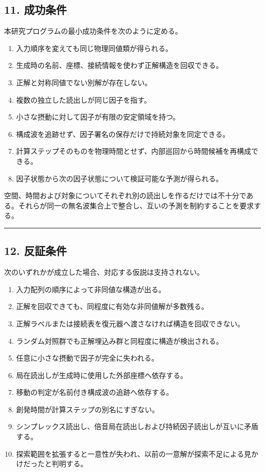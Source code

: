 \documentclass[
  a4paper,
]{ltjsarticle}
\providecommand{\tightlist}{%
  \setlength{\itemsep}{0pt}\setlength{\parskip}{0pt}}
\begin{document}
\subsection{11. 成功条件}\label{ux6210ux529fux6761ux4ef6}

本研究プログラムの最小成功条件を次のように定める。

\begin{enumerate}
\def\labelenumi{\arabic{enumi}.}
\tightlist
\item
  入力順序を変えても同じ物理同値類が得られる。
\item
  生成時の名前、座標、接続情報を使わず正解構造を回収できる。
\item
  正解と対称同値でない別解が存在しない。
\item
  複数の独立した読出しが同じ因子を指す。
\item
  小さな摂動に対して因子が有限の安定領域を持つ。
\item
  構成波を追跡せず、因子署名の保存だけで持続対象を同定できる。
\item
  計算ステップそのものを物理時間とせず、内部巡回から時間候補を再構成できる。
\item
  因子状態から次の因子状態について検証可能な予測が得られる。
\end{enumerate}

空間、時間および対象についてそれぞれ別の読出しを作るだけでは不十分である。それらが同一の無名波集合上で整合し、互いの予測を制約することを要求する。

\begin{center}\rule{0.5\linewidth}{0.5pt}\end{center}

\subsection{12. 反証条件}\label{ux53cdux8a3cux6761ux4ef6}

次のいずれかが成立した場合、対応する仮説は支持されない。

\begin{enumerate}
\def\labelenumi{\arabic{enumi}.}
\tightlist
\item
  入力配列の順序によって非同値な構造が出る。
\item
  正解を回収できても、同程度に有効な非同値解が多数残る。
\item
  正解ラベルまたは接続表を復元器へ渡さなければ構造を回収できない。
\item
  ランダム対照群でも正解埋込み群と同程度に構造が検出される。
\item
  任意に小さな摂動で因子が完全に失われる。
\item
  局在読出しが生成時に使用した外部座標へ依存する。
\item
  移動の判定が名前付き構成波の追跡へ依存する。
\item
  創発時間が計算ステップの別名にすぎない。
\item
  シンプレックス読出し、倍音局在読出しおよび持続因子読出しが互いに矛盾する。
\item
  探索範囲を拡張すると一意性が失われ、以前の一意解が探索不足による見かけだったと判明する。
\end{enumerate}
\end{document}
